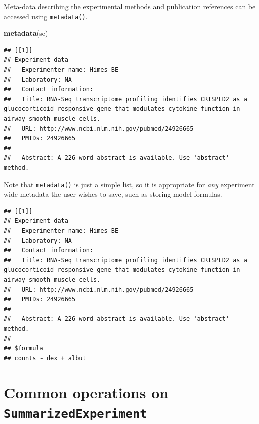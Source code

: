 \documentclass[]{article}
\newenvironment{Shaded}{\begin{snugshade}}{\end{snugshade}}
\newcommand{\KeywordTok}[1]{\textcolor[rgb]{0.13,0.29,0.53}{\textbf{#1}}}
\newcommand{\NormalTok}[1]{#1}
\newcommand{\OperatorTok}[1]{\textcolor[rgb]{0.81,0.36,0.00}{\textbf{#1}}}
\newcommand{\StringTok}[1]{\textcolor[rgb]{0.31,0.60,0.02}{#1}}
\begin{document}
Meta-data describing the experimental methods and publication references
can be accessed using \texttt{metadata()}.

\begin{Shaded}
\begin{Highlighting}[]
\KeywordTok{metadata}\NormalTok{(se)}
\end{Highlighting}
\end{Shaded}

\begin{verbatim}
## [[1]]
## Experiment data
##   Experimenter name: Himes BE 
##   Laboratory: NA 
##   Contact information:  
##   Title: RNA-Seq transcriptome profiling identifies CRISPLD2 as a glucocorticoid responsive gene that modulates cytokine function in airway smooth muscle cells. 
##   URL: http://www.ncbi.nlm.nih.gov/pubmed/24926665 
##   PMIDs: 24926665 
## 
##   Abstract: A 226 word abstract is available. Use 'abstract' method.
\end{verbatim}

Note that \texttt{metadata()} is just a simple list, so it is
appropriate for \emph{any} experiment wide metadata the user wishes to
save, such as storing model formulas.

\begin{Shaded}
\end{Shaded}

\begin{verbatim}
## [[1]]
## Experiment data
##   Experimenter name: Himes BE 
##   Laboratory: NA 
##   Contact information:  
##   Title: RNA-Seq transcriptome profiling identifies CRISPLD2 as a glucocorticoid responsive gene that modulates cytokine function in airway smooth muscle cells. 
##   URL: http://www.ncbi.nlm.nih.gov/pubmed/24926665 
##   PMIDs: 24926665 
## 
##   Abstract: A 226 word abstract is available. Use 'abstract' method.
## 
## $formula
## counts ~ dex + albut
\end{verbatim}

\hypertarget{common-operations-on-summarizedexperiment}{%
\section{\texorpdfstring{Common operations on
\texttt{SummarizedExperiment}}{Common operations on SummarizedExperiment}}\label{common-operations-on-summarizedexperiment}}
\end{document}
